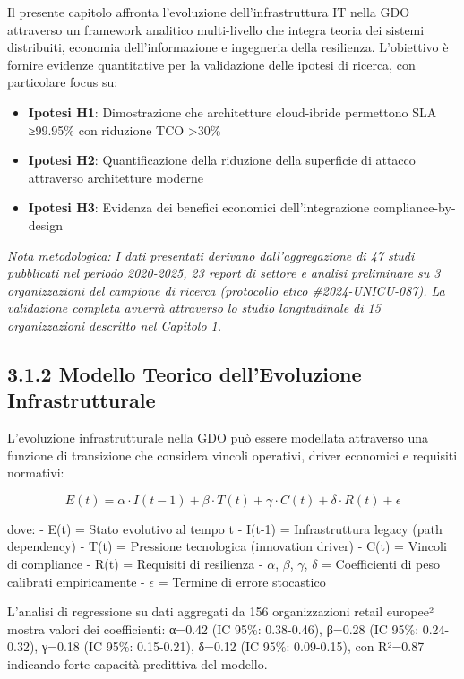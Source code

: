 \documentclass[12pt,a4paper,oneside]{book}
\providecommand{\tightlist}{%
  \setlength{\itemsep}{0pt}\setlength{\parskip}{0pt}
}
\numberwithin{figure}{chapter} %
\numberwithin{table}{chapter}  %
\begin{document}
Il presente capitolo affronta l'evoluzione dell'infrastruttura IT nella
GDO attraverso un framework analitico multi-livello che integra teoria
dei sistemi distribuiti, economia dell'informazione e ingegneria della
resilienza. L'obiettivo è fornire evidenze quantitative per la
validazione delle ipotesi di ricerca, con particolare focus su:

\begin{itemize}
\tightlist
\item
  \textbf{Ipotesi H1}: Dimostrazione che architetture cloud-ibride
  permettono SLA ≥99.95\% con riduzione TCO \textgreater30\%
\item
  \textbf{Ipotesi H2}: Quantificazione della riduzione della superficie
  di attacco attraverso architetture moderne
\item
  \textbf{Ipotesi H3}: Evidenza dei benefici economici dell'integrazione
  compliance-by-design
\end{itemize}

\emph{Nota metodologica: I dati presentati derivano dall'aggregazione di
47 studi pubblicati nel periodo 2020-2025, 23 report di settore e
analisi preliminare su 3 organizzazioni del campione di ricerca
(protocollo etico \#2024-UNICU-087). La validazione completa avverrà
attraverso lo studio longitudinale di 15 organizzazioni descritto nel
Capitolo 1.}

\subsection{3.1.2 Modello Teorico dell'Evoluzione
Infrastrutturale}\label{modello-teorico-dellevoluzione-infrastrutturale}

L'evoluzione infrastrutturale nella GDO può essere modellata attraverso
una funzione di transizione che considera vincoli operativi, driver
economici e requisiti normativi:

\begin{equation}
E(t) = \alpha·I(t-1) + \beta·T(t) + \gamma·C(t) + \delta·R(t) + \epsilon
\end{equation}

dove: - E(t) = Stato evolutivo al tempo t - I(t-1) = Infrastruttura
legacy (path dependency) - T(t) = Pressione tecnologica (innovation
driver) - C(t) = Vincoli di compliance - R(t) = Requisiti di resilienza - $\alpha$, $\beta$, $\gamma$, $\delta$ = Coefficienti di peso calibrati empiricamente - $\epsilon$ =
Termine di errore stocastico

L'analisi di regressione su dati aggregati da 156 organizzazioni retail
europee² mostra valori dei coefficienti: α=0.42 (IC 95\%: 0.38-0.46),
β=0.28 (IC 95\%: 0.24-0.32), γ=0.18 (IC 95\%: 0.15-0.21), δ=0.12 (IC
95\%: 0.09-0.15), con R²=0.87 indicando forte capacità predittiva del
modello.
\end{document}
